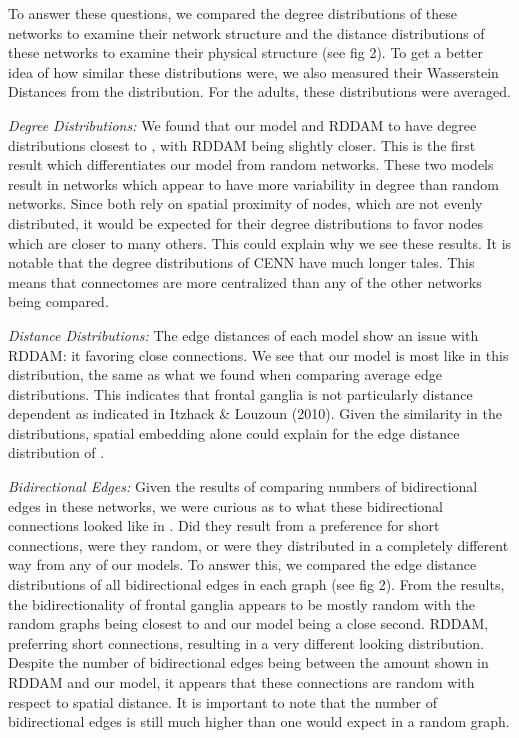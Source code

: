 To answer these questions, we compared the degree distributions of these networks to examine their network structure and the distance distributions of these networks to examine their physical structure (see fig 2). To get a better idea of how similar these distributions were, we also measured their Wasserstein Distances from the \ce distribution. For the adults, these distributions were averaged.

\textit{Degree Distributions:} We found that our model and RDDAM to have degree distributions closest to \ce, with RDDAM being slightly closer. This is the first result which differentiates our model from random networks. These two models result in networks which appear to have more variability in degree than random networks. Since both rely on spatial proximity of nodes, which are not evenly distributed, it would be expected for their degree distributions to favor nodes which are closer to many others. This could explain why we see these results. It is notable that the degree distributions of CENN have much longer tales. This means that \ce connectomes are more centralized than any of the other networks being compared.

\textit{Distance Distributions:} The edge distances of each model show an issue with RDDAM: it favoring close connections. We see that our model is most like \ce in this distribution, the same as what we found when comparing average edge distributions. This indicates that \ce frontal ganglia is not particularly distance dependent as indicated in Itzhack \& Louzoun (2010). Given the similarity in the distributions, spatial embedding alone could explain for the edge distance distribution of \ce. 

\textit{Bidirectional Edges:} Given the results of comparing numbers of bidirectional edges in these networks, we were curious as to what these bidirectional connections looked like in \ce. Did they result from a preference for short connections, were they random, or were they distributed in a completely different way from any of our models. To answer this, we compared the edge distance distributions of all bidirectional edges in each graph (see fig 2). From the results, the bidirectionality of \ce frontal ganglia appears to be mostly random with the random graphs being closest to \ce and our model being a close second. RDDAM, preferring short connections, resulting in a very different looking distribution. Despite the number of bidirectional edges being between the amount shown in RDDAM and our model, it appears that these connections are random with respect to spatial distance. It is important to note that the number of bidirectional edges is still much higher than one would expect in a random graph. 

